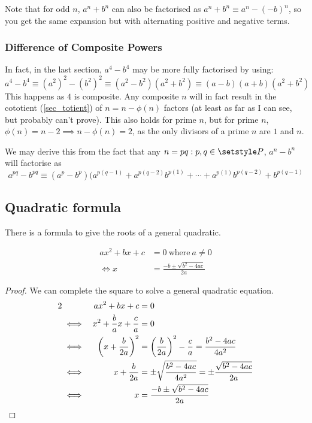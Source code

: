 Note that for odd \(n\), \(a^n + b^n\) can also be factorised as
\(a^n + b^n \equiv a^n - (-b)^n\), so you get the same expansion but with
alternating positive and negative terms.


\subsubsection{Difference of Composite Powers}

In fact, in the last section, \(a^4 - b^4\) may be more fully factorised by
using:
\begin{equation*}
a^4 - b^4 \equiv (a^2)^2 - (b^2)^2 \equiv (a^2 - b^2)(a^2 + b^2) \equiv
    (a - b)(a + b)(a^2 + b^2)
\end{equation*}
This happens as \(4\) is composite. Any composite \(n\) will in fact result
in the cototient (\ref{sec_totient}) of \(n = n - \phi(n)\) factors (at
least as far as I can see, but probably can't prove). This
also holds for prime \(n\), but for prime \(n\),
\(\phi(n) = n - 2 \implies n - \phi(n) = 2\), as the only divisors of
a prime \(n\) are \(1\) and \(n\).

We may derive this from the fact that any \(n = pq: p, q \in \setstyle P\),
\(a^n - b^n\) will factorise as
\begin{equation}
a^{pq} - b^{pq} \equiv
 (a^p - b^p)(a^{p(q - 1)} + a^{p(q - 2)}b^{p(1)} + \dotsb +
             a^{p(1)}b^{p(q - 2)} + b^{p(q - 1)}
\end{equation}

\subsection{Quadratic formula} \label{sec_quad_formula}

There is a formula to give the roots of a general quadratic.
\begin{theorem}
\begin{align*}
ax^2 + bx + c &= 0\ \text{where}\ a \neq 0 \\
\iff x &= \frac{-b \pm \sqrt{b^2 - 4ac}}{2a}
\end{align*}
\end{theorem}
\begin{proof}
We can complete the square to solve a general quadratic equation.
\begin{alignat*}2
&&ax^2 + bx + c &= 0 \\
&\iff& x^2 + \frac ba x + \frac ca &= 0 \\
&\iff& \pqty{x + \frac b{2a}}^2 &= \pqty{\frac b{2a}}^2 - \frac ca
    = \frac{b^2 - 4ac}{4a^2} \\
&\iff& x + \frac b{2a} &= \pm \sqrt{\frac{b^2 - 4ac}{4a^2}}
    = \pm \frac{\sqrt{b^2 - 4ac}}{2a} \\
&\iff& x &= \frac{-b \pm \sqrt{b^2 - 4ac}}{2a} \qedhere
\end{alignat*}
\end{proof}

